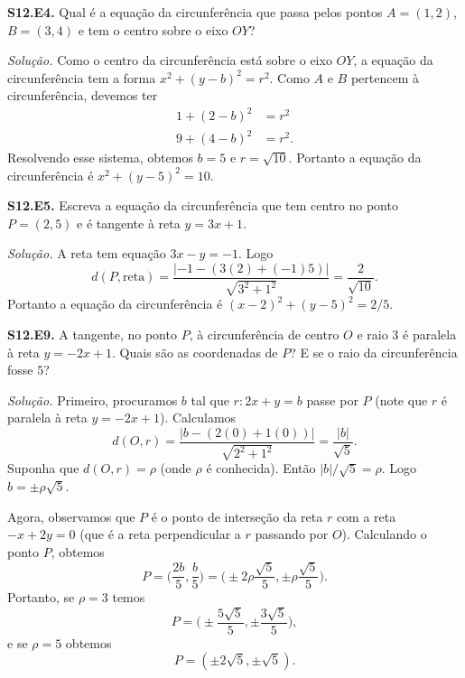 \documentclass[a4paper,11pt]{article}
\begin{document}
\textbf{S12.E4.}
Qual é a equação da circunferência que passa pelos pontos $A = (1,2)$, $B = (3,4)$ e tem o centro sobre o eixo $OY$?

\vspace{\baselineskip}

\emph{Solução.}
Como o centro da circunferência está sobre o eixo $OY$, a equação da circunferência tem a forma $x^2 + (y-b)^2 = r^2$.
Como $A$ e $B$ pertencem à circunferência, devemos ter
\begin{align*}
  1 + (2 - b)^2 & = r^2 \\
  9 + (4 - b)^2 & = r^2.
\end{align*}
Resolvendo esse sistema, obtemos $b = 5$ e $r = \sqrt{10}$.
Portanto a equação da circunferência é $x^2 + (y - 5)^2 = 10$.

\vspace{\baselineskip}

\textbf{S12.E5.}
Escreva a equação da circunferência que tem centro no ponto $P = (2,5)$ e é tangente à reta $y = 3x + 1$.

\vspace{\baselineskip}

\emph{Solução.}
A reta tem equação $3x - y = -1$.
Logo
\[
  d(P,\mathrm{reta}) = \frac{|-1-(3(2) + (-1)5)|}{\sqrt{3^2 + 1^2}} = \frac{2}{\sqrt{10}}.
\]
Portanto a equação da circunferência é $(x-2)^2 + (y-5)^2 = 2/5$.

\vspace{\baselineskip}

\textbf{S12.E9.}
A tangente, no ponto $P$, à circunferência de centro $O$ e raio $3$ é paralela à reta $y = -2x + 1$.
Quais são as coordenadas de $P$?
E se o raio da circunferência fosse $5$?

\vspace{\baselineskip}

\emph{Solução.}
Primeiro, procuramos $b$ tal que $r: 2x + y = b$ passe por $P$ (note que $r$ é paralela à reta $y = -2x + 1$).
Calculamos
\[
  d(O,r) = \frac{|b - (2(0) + 1(0))|}{\sqrt{2^2 + 1^2}} = \frac{|b|}{\sqrt{5}}.
\]
Suponha que $d(O,r) = \rho$ (onde $\rho$ é conhecida).
Então $|b|/\sqrt{5} = \rho$.
Logo $b = \pm \rho \sqrt{5}$.

Agora, observamos que $P$ é o ponto de interseção da reta $r$ com a reta $-x + 2y = 0$ (que é a reta perpendicular a $r$ passando por $O$).
Calculando o ponto $P$, obtemos
\[
  P = \Big( \frac{2b}{5}, \frac{b}{5} \Big) = \Big( \pm 2\rho \frac{\sqrt{5}}{5}, \pm \rho \frac{\sqrt{5}}{5} \Big).
\]
Portanto, se $\rho = 3$ temos
\[
  P = \Big( \pm \frac{5 \sqrt{5}}{5}, \pm \frac{3\sqrt{5}}{5} \Big),
\]
e se $\rho = 5$ obtemos
\[
  P = ( \pm 2\sqrt{5}, \pm \sqrt{5}).
\]
\end{document}
